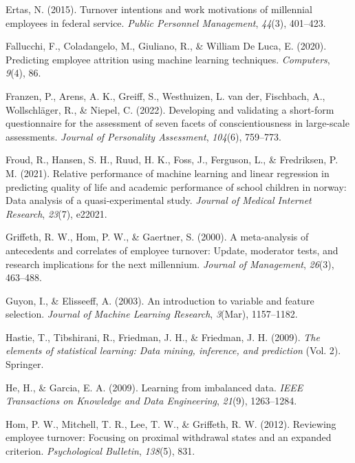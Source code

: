 \documentclass[
  man]{apa7}
\newlength{\cslhangindent}
\newenvironment{CSLReferences}[2] %
 {\begin{list}{}{%
  \setlength{\itemindent}{0pt}
  \setlength{\leftmargin}{0pt}
  \setlength{\parsep}{0pt}
  \ifodd #1
   \setlength{\leftmargin}{\cslhangindent}
   \setlength{\itemindent}{-1\cslhangindent}
  \fi
  \setlength{\itemsep}{#2\baselineskip}}}
 {\end{list}}
\begin{document}
\begin{CSLReferences}{1}{0}
Ertas, N. (2015). Turnover intentions and work motivations of millennial employees in federal service. \emph{Public Personnel Management}, \emph{44}(3), 401--423.

Fallucchi, F., Coladangelo, M., Giuliano, R., \& William De Luca, E. (2020). Predicting employee attrition using machine learning techniques. \emph{Computers}, \emph{9}(4), 86.

Franzen, P., Arens, A. K., Greiff, S., Westhuizen, L. van der, Fischbach, A., Wollschläger, R., \& Niepel, C. (2022). Developing and validating a short-form questionnaire for the assessment of seven facets of conscientiousness in large-scale assessments. \emph{Journal of Personality Assessment}, \emph{104}(6), 759--773.

Froud, R., Hansen, S. H., Ruud, H. K., Foss, J., Ferguson, L., \& Fredriksen, P. M. (2021). Relative performance of machine learning and linear regression in predicting quality of life and academic performance of school children in norway: Data analysis of a quasi-experimental study. \emph{Journal of Medical Internet Research}, \emph{23}(7), e22021.

Griffeth, R. W., Hom, P. W., \& Gaertner, S. (2000). A meta-analysis of antecedents and correlates of employee turnover: Update, moderator tests, and research implications for the next millennium. \emph{Journal of Management}, \emph{26}(3), 463--488.

Guyon, I., \& Elisseeff, A. (2003). An introduction to variable and feature selection. \emph{Journal of Machine Learning Research}, \emph{3}(Mar), 1157--1182.

Hastie, T., Tibshirani, R., Friedman, J. H., \& Friedman, J. H. (2009). \emph{The elements of statistical learning: Data mining, inference, and prediction} (Vol. 2). Springer.

He, H., \& Garcia, E. A. (2009). Learning from imbalanced data. \emph{IEEE Transactions on Knowledge and Data Engineering}, \emph{21}(9), 1263--1284.

Hom, P. W., Mitchell, T. R., Lee, T. W., \& Griffeth, R. W. (2012). Reviewing employee turnover: Focusing on proximal withdrawal states and an expanded criterion. \emph{Psychological Bulletin}, \emph{138}(5), 831.


\end{CSLReferences}
\end{document}
